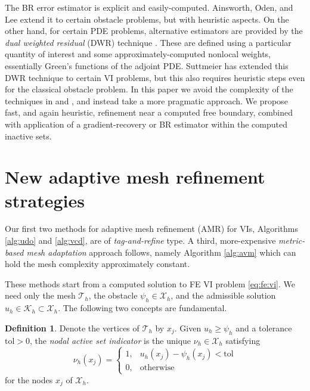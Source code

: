 \documentclass[]{interact}
\theoremstyle{plain}%
\theoremstyle{definition}
\newtheorem{definition}[theorem]{Definition}
\theoremstyle{remark}
\newcommand{\cK}{\mathcal{K}}
\newcommand{\cT}{\mathcal{T}}
\newcommand{\cX}{\mathcal{X}}
\begin{document}
The BR error estimator is explicit and easily-computed.  Ainsworth, Oden, and Lee \cite{AinsworthOdenLee1993} extend it to certain obstacle problems, but with heuristic aspects.  On the other hand, for certain PDE problems, alternative estimators are provided by the \emph{dual weighted residual} (DWR) technique \cite{BangerthRannacher2003}.  These are defined using a particular quantity of interest and some approximately-computed nonlocal weights, essentially Green's functions of the adjoint PDE.  Suttmeier \cite{Suttmeier2008} has extended this DWR technique to certain VI problems, but this also requires heuristic steps even for the classical obstacle problem.  In this paper we avoid the complexity of the techniques in \cite{AinsworthOdenLee1993} and \cite{Suttmeier2008}, and instead take a more pragmatic approach.  We propose fast, and again heuristic, refinement near a computed free boundary, combined with application of a gradient-recovery or BR estimator within the computed inactive sets.


\section{New adaptive mesh refinement strategies} \label{sec:viamr}

Our first two methods for adaptive mesh refinement (AMR) for VIs, Algorithms \ref{alg:udo} and \ref{alg:vcd}, are of \emph{tag-and-refine} type.  A third, more-expensive \emph{metric-based mesh adaptation} approach \cite{Wallworketal2020} follows, namely Algorithm \ref{alg:avm} which can hold the mesh complexity approximately constant.

These methods start from a computed solution to FE VI problem \eqref{eq:fe:vi}.  We need only the mesh $\cT_h$, the obstacle $\psi_h \in \cX_h$, and the admissible solution $u_h \in \cK_h \subset \cX_h$.  The following two concepts are fundamental.

\begin{definition} \label{def:nodalactive}
Denote the vertices of $\cT_h$ by $x_j$.  Given $u_h \ge \psi_h$ and a tolerance $\text{tol}>0$, the \emph{nodal active set indicator} is the unique $\nu_h\in\cX_h$ satisfying
	$$\nu_h(x_j) = \begin{cases} 1, & u_h(x_j) - \psi_h(x_j) < \text{tol} \\
	                             0, & \text{otherwise}\end{cases}$$
for the nodes $x_j$ of $\cX_h$.
\end{definition}
\end{document}
